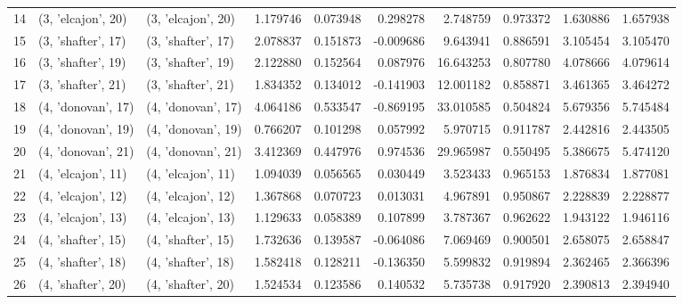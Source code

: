 \begin{tabular}{lllrrrrrrr}
14 &  (3, 'elcajon', 20) &  (3, 'elcajon', 20) &  1.179746 &   0.073948 &  0.298278 &   2.748759 &  0.973372 &   1.630886 &  1.657938 \\
15 &  (3, 'shafter', 17) &  (3, 'shafter', 17) &  2.078837 &   0.151873 & -0.009686 &   9.643941 &  0.886591 &   3.105454 &  3.105470 \\
16 &  (3, 'shafter', 19) &  (3, 'shafter', 19) &  2.122880 &   0.152564 &  0.087976 &  16.643253 &  0.807780 &   4.078666 &  4.079614 \\
17 &  (3, 'shafter', 21) &  (3, 'shafter', 21) &  1.834352 &   0.134012 & -0.141903 &  12.001182 &  0.858871 &   3.461365 &  3.464272 \\
18 &  (4, 'donovan', 17) &  (4, 'donovan', 17) &  4.064186 &   0.533547 & -0.869195 &  33.010585 &  0.504824 &   5.679356 &  5.745484 \\
19 &  (4, 'donovan', 19) &  (4, 'donovan', 19) &  0.766207 &   0.101298 &  0.057992 &   5.970715 &  0.911787 &   2.442816 &  2.443505 \\
20 &  (4, 'donovan', 21) &  (4, 'donovan', 21) &  3.412369 &   0.447976 &  0.974536 &  29.965987 &  0.550495 &   5.386675 &  5.474120 \\
21 &  (4, 'elcajon', 11) &  (4, 'elcajon', 11) &  1.094039 &   0.056565 &  0.030449 &   3.523433 &  0.965153 &   1.876834 &  1.877081 \\
22 &  (4, 'elcajon', 12) &  (4, 'elcajon', 12) &  1.367868 &   0.070723 &  0.013031 &   4.967891 &  0.950867 &   2.228839 &  2.228877 \\
23 &  (4, 'elcajon', 13) &  (4, 'elcajon', 13) &  1.129633 &   0.058389 &  0.107899 &   3.787367 &  0.962622 &   1.943122 &  1.946116 \\
24 &  (4, 'shafter', 15) &  (4, 'shafter', 15) &  1.732636 &   0.139587 & -0.064086 &   7.069469 &  0.900501 &   2.658075 &  2.658847 \\
25 &  (4, 'shafter', 18) &  (4, 'shafter', 18) &  1.582418 &   0.128211 & -0.136350 &   5.599832 &  0.919894 &   2.362465 &  2.366396 \\
26 &  (4, 'shafter', 20) &  (4, 'shafter', 20) &  1.524534 &   0.123586 &  0.140532 &   5.735738 &  0.917920 &   2.390813 &  2.394940 \\
\bottomrule
\end{tabular}
